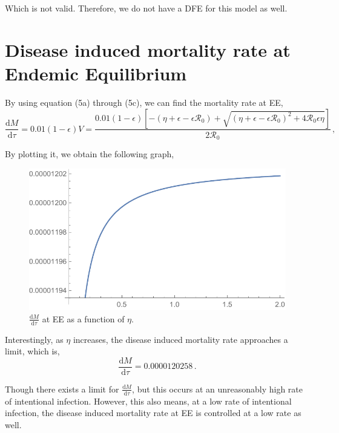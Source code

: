 \documentclass[12pt]{article}
\newcommand\dbyd[2]{\frac{\mathrm d{#1}}{\mathrm d{#2}}}
\newcommand{\R}{\mathcal{R}}
\begin{document}
Which is not valid. Therefore, we do not have a DFE for this model as well.

\section{Disease induced mortality rate at Endemic Equilibrium}

By using equation (5a) through (5c), we can find the mortality rate at EE,
\begin{equation}
\dbyd{M}{\tau}=0.01(1-\epsilon)V=\frac{0.01(1-\epsilon)[-(\eta+\epsilon-\epsilon\R_0)+\sqrt{(\eta+\epsilon-\epsilon\R_0)^2+4\R_0\epsilon \eta}]}{2\R_0}\,,
\end{equation}

By plotting it, we obtain the following graph,
\begin{figure}[H]
  \centering
  \includegraphics[width=1\textwidth]{Figures/M_at_EE.pdf}
  \caption{$\dbyd{M}{\tau}$ at EE as a function of $\eta$.}
\end{figure}

Interestingly, as $\eta$ increases, the disease induced mortality rate approaches a limit, which is,
\begin{equation}
\dbyd{M}{\tau}=0.0000120258\,.
\end{equation}

Though there exists a limit for $\dbyd{M}{\tau}$, but this occurs at an unreasonably high rate of intentional infection. However, this also means, at a low rate of intentional infection, the disease induced mortality rate at EE is controlled at a low rate as well.
\end{document}
